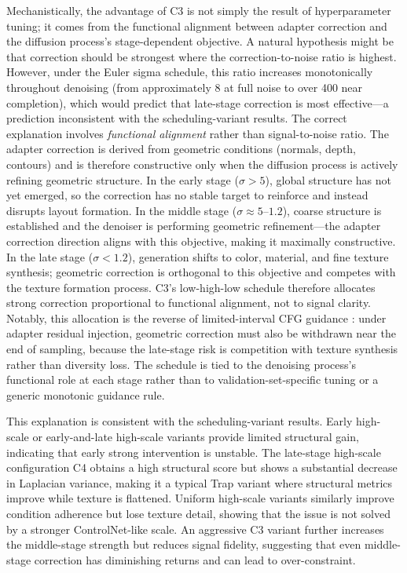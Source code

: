\documentclass[times,twocolumn,final]{elsarticle}
\begin{document}
Mechanistically, the advantage of C3 is not simply the result of hyperparameter tuning; it comes from the functional alignment between adapter correction and the diffusion process's stage-dependent objective. A natural hypothesis might be that correction should be strongest where the correction-to-noise ratio is highest. However, under the Euler sigma schedule, this ratio increases monotonically throughout denoising (from approximately 8 at full noise to over 400 near completion), which would predict that late-stage correction is most effective---a prediction inconsistent with the scheduling-variant results. The correct explanation involves \emph{functional alignment} rather than signal-to-noise ratio. The adapter correction is derived from geometric conditions (normals, depth, contours) and is therefore constructive only when the diffusion process is actively refining geometric structure. In the early stage ($\sigma > 5$), global structure has not yet emerged, so the correction has no stable target to reinforce and instead disrupts layout formation. In the middle stage ($\sigma \approx 5$--$1.2$), coarse structure is established and the denoiser is performing geometric refinement---the adapter correction direction aligns with this objective, making it maximally constructive. In the late stage ($\sigma < 1.2$), generation shifts to color, material, and fine texture synthesis; geometric correction is orthogonal to this objective and competes with the texture formation process. C3's low-high-low schedule therefore allocates strong correction proportional to functional alignment, not to signal clarity. Notably, this allocation is the reverse of limited-interval CFG guidance \cite{kynkanniemi2024limited}: under adapter residual injection, geometric correction must also be withdrawn near the end of sampling, because the late-stage risk is competition with texture synthesis rather than diversity loss. The schedule is tied to the denoising process's functional role at each stage rather than to validation-set-specific tuning or a generic monotonic guidance rule.

This explanation is consistent with the scheduling-variant results. Early high-scale or early-and-late high-scale variants provide limited structural gain, indicating that early strong intervention is unstable. The late-stage high-scale configuration C4 obtains a high structural score but shows a substantial decrease in Laplacian variance, making it a typical Trap variant where structural metrics improve while texture is flattened. Uniform high-scale variants similarly improve condition adherence but lose texture detail, showing that the issue is not solved by a stronger ControlNet-like scale. An aggressive C3 variant further increases the middle-stage strength but reduces signal fidelity, suggesting that even middle-stage correction has diminishing returns and can lead to over-constraint.
\end{document}
